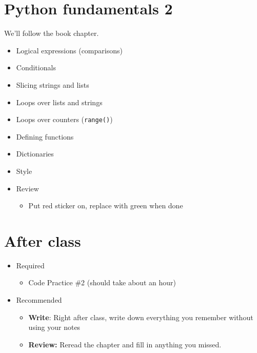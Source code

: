 \documentclass[11pt]{article}
\begin{document}
\section*{Python fundamentals 2}

We'll follow the book chapter.
\begin{itemize}
\item Logical expressions (comparisons)
\item Conditionals
\item Slicing strings and lists
\item Loops over lists and strings
\item Loops over counters ({\tt range()})
\item Defining functions
\item Dictionaries
\item Style
\item Review
\begin{itemize}
\item Put red sticker on, replace with green when done
\end{itemize}
\end{itemize}

\section*{After class}

\begin{itemize}
\item Required
\begin{itemize}
\item Code Practice \#2 (should take about an hour)
\end{itemize}
\item Recommended
\begin{itemize}
\item {\bf Write}:  Right after class, write down everything you remember without using your notes
\item {\bf Review:} Reread the chapter and fill in anything you missed.
\end{itemize}
\end{itemize}


\end{document}

